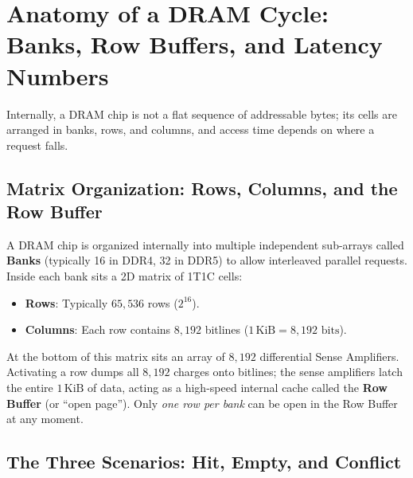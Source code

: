 \chapterline

\section{Anatomy of a DRAM Cycle: Banks, Row Buffers, and Latency Numbers}

Internally, a DRAM chip is not a flat sequence of addressable bytes; its cells are
arranged in banks, rows, and columns, and access time depends on where a request falls.

\subsection{Matrix Organization: Rows, Columns, and the Row Buffer}

A DRAM chip is organized internally into multiple independent sub-arrays called
\textbf{Banks} (typically 16 in DDR4, 32 in DDR5) to allow interleaved parallel requests.
Inside each bank sits a 2D matrix of 1T1C cells:
\begin{itemize}[itemsep=0pt]
    \item \textbf{Rows}: Typically $65{,}536$ rows ($2^{16}$).
    \item \textbf{Columns}: Each row contains $8{,}192$ bitlines ($1\,\text{KiB} = 8{,}192\text{ bits}$).
\end{itemize}

At the bottom of this matrix sits an array of $8{,}192$ differential Sense Amplifiers.
Activating a row dumps all $8{,}192$ charges onto bitlines; the sense amplifiers latch
the entire $1\,\text{KiB}$ of data, acting as a high-speed internal cache called the
\textbf{Row Buffer} (or ``open page'').
Only \emph{one row per bank} can be open in the Row Buffer at any moment.

\subsection{The Three Scenarios: Hit, Empty, and Conflict}

